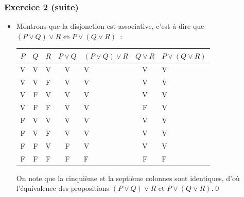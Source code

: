 \documentclass[10pt,notheorems]{beamer}
\theoremstyle{plain}
\theoremstyle{definition} %
\begin{document}
\begin{frame}
  \frametitle{Exercice 2 (suite)}
  \fontsize{8}{10}\selectfont

  \begin{itemize}

  \item Montrons que la disjonction est associative, c'est-à-dire que $(P\lor Q)\lor R \Leftrightarrow P\lor (Q\lor R)$~:\newline
    \begin{table}[H]
      \centering
      \begin{tabular}[H]{|ccc|cgcg|}
        \hline
        $P$ & $Q$ & $R$ & $P\lor Q$ & $(P\lor Q)\lor R$ & $Q\lor R$ & $P \lor (Q \lor R)$ \\ \hline
        V & V & V & V & V & V & V\\
        V & V & F & V & V & V & V\\
        V & F & V & V & V & V & V\\
        V & F & F & V & V & F & V\\
        F & V & V & V & V & V & V\\
        F & V & F & V & V & V & V\\
        F & F & V & F & V & V & V\\
        F & F & F & F & F & F & F\\
        \hline\hline
      \end{tabular}
    \end{table}

    \bigskip

    On note que la cinquième et la septième colonnes sont identiques, d'où
    l'équivalence des propositions $(P\lor Q)\lor R$ et $P\lor (Q\lor R)$.\qed\newline

  \end{itemize}

\end{frame}
\end{document}
